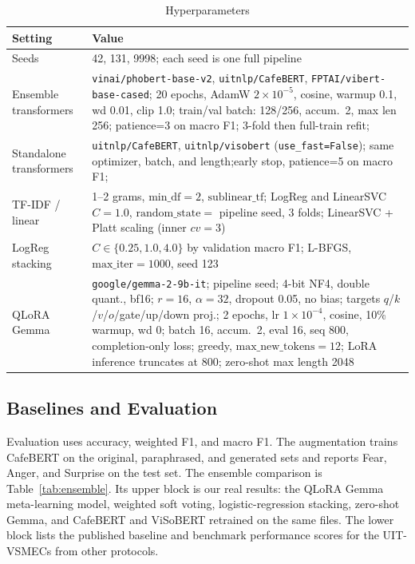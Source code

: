 \documentclass[conference]{IEEEtran}
\begin{document}
\begin{table}[H]
\caption{Hyperparameters}
\label{tab:repro_params}
\centering
\scriptsize
\setlength{\tabcolsep}{3pt}
\renewcommand{\arraystretch}{0.9}
\begin{tabular}{@{}lp{}@{}}
\toprule
Setting & Value \\
\midrule
Seeds &
  42, 131, 9998; each seed is one full pipeline \\
Ensemble transformers &
  \texttt{vinai/phobert-base-v2}, \texttt{uitnlp/CafeBERT},
  \texttt{FPTAI/vibert-base-cased};
  20 epochs, AdamW $2\times10^{-5}$, cosine, warmup 0.1, wd 0.01, clip 1.0;
  train/val batch: 128/256, accum.\ 2, max len 256; patience=3 on macro F1;
  3-fold then full-train refit; \\
Standalone transformers &
  \texttt{uitnlp/CafeBERT}, \texttt{uitnlp/visobert}
  (\texttt{use\_fast=False}); same optimizer, batch, and length;early stop, patience=5 on macro F1; \\
TF-IDF / linear &
  1--2 grams, $\mathrm{min\_df}=2$, $\mathrm{sublinear\_tf}$;
  LogReg and LinearSVC $C=1.0$, $\mathrm{random\_state}=$ pipeline seed, 3 folds;
  LinearSVC + Platt scaling (inner $cv=3$) \\
LogReg stacking &
  $C\in\{0.25,1.0,4.0\}$ by validation macro F1;
  L-BFGS, $\mathrm{max\_iter}=1000$, seed 123 \\
QLoRA Gemma &
  \texttt{google/gemma-2-9b-it}; pipeline seed;
  4-bit NF4, double quant., bf16;
  $r=16$, $\alpha=32$, dropout 0.05, no bias;
  targets $q$/$k$/$v$/$o$/gate/up/down proj.;
  2 epochs, lr $1\times10^{-4}$, cosine, 10\% warmup, wd 0;
  batch 16, accum.\ 2, eval 16, seq 800, completion-only loss;
  greedy, $\mathrm{max\_new\_tokens}=12$;
  LoRA inference truncates at 800; zero-shot max length 2048 \\
\bottomrule
\end{tabular}
\end{table}

\subsection{Baselines and Evaluation}

Evaluation uses accuracy, weighted F1, and macro F1.
The augmentation trains CafeBERT on the original, paraphrased, and generated sets and reports Fear, Anger, and Surprise on the test set.
The ensemble comparison is Table~\ref{tab:ensemble}.
Its upper block is our real results: the QLoRA Gemma meta-learning model, weighted soft voting, logistic-regression stacking, zero-shot Gemma, and CafeBERT and ViSoBERT retrained on the same files.
The lower block lists the published baseline and benchmark performance scores for the UIT-VSMECs from other protocols.
\end{document}
